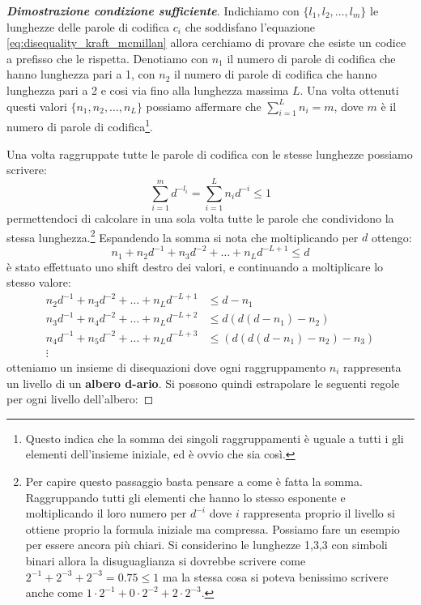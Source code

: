 \documentclass{article}
\theoremstyle{definition}
\numberwithin{equation}{section}
\begin{document}
\begin{proof}[\textbf{Dimostrazione condizione sufficiente}]
    Indichiamo con $\{l_1,l_2,\ldots,l_m\}$ le lunghezze delle parole di codifica $c_i$ che soddisfano l'equazione \eqref{eq:disequality_kraft_mcmillan} allora cerchiamo di provare che esiste un codice a prefisso che le rispetta. Denotiamo con $n_1$ il numero di parole di codifica che hanno lunghezza pari a 1, con $n_2$ il numero di parole di codifica che hanno lunghezza pari a 2 e cosi via fino alla lunghezza massima $L$. Una volta ottenuti questi valori $\{n_1,n_2,\ldots,n_L\}$ possiamo affermare che $\sum_{i=1}^L n_i=m$, dove $m$ è il numero di parole di codifica\footnote{Questo indica che la somma dei singoli raggruppamenti è uguale a tutti i gli elementi dell'insieme iniziale, ed è ovvio che sia così.}.

    Una volta raggruppate tutte le parole di codifica con le stesse lunghezze possiamo scrivere:
    \[
        \sum_{i=1}^m d^{-l_i}=\sum_{i=1}^L n_id^{-i}\leq 1
    \]
    permettendoci di calcolare in una sola volta tutte le parole che condividono la stessa lunghezza.\footnote{Per capire questo passaggio basta pensare a come è fatta la somma. Raggruppando tutti gli elementi che hanno lo stesso esponente e moltiplicando il loro numero per $d^{-i}$ dove $i$ rappresenta proprio il livello si ottiene proprio la formula iniziale ma compressa. Possiamo fare un esempio per essere ancora più chiari. Si considerino le lunghezze 1,3,3 con simboli binari allora la disuguaglianza si dovrebbe scrivere come $2^{-1}+ 2^{-3}+2^{-3}=0.75\leq1$ ma la stessa cosa si poteva benissimo scrivere anche come $1\cdot 2^{-1}+0\cdot 2^{-2}+2\cdot 2^{-3}$.} Espandendo la somma si nota che moltiplicando per $d$ ottengo:
    \[
        n_1+n_2d^{-1}+n_3d^{-2}+\ldots+n_Ld^{-L+1}\leq d
    \]
    è stato effettuato uno shift destro dei valori, e continuando a moltiplicare lo stesso valore:
    \begin{align*}
        n_2d^{-1}+n_3d^{-2}+\ldots+n_Ld^{-L+1} & \leq d-n_1                 \\
        n_3d^{-1}+n_4d^{-2}+\ldots+n_Ld^{-L+2} & \leq d(d(d-n_1)-n_2)       \\
        n_4d^{-1}+n_5d^{-2}+\ldots+n_Ld^{-L+3} & \leq (d(d(d-n_1)-n_2)-n_3) \\
        \vdots
    \end{align*}
    otteniamo un insieme di disequazioni dove ogni raggruppamento $n_i$ rappresenta un livello di un \textbf{albero d-ario}. Si possono quindi estrapolare le seguenti regole per ogni livello dell'albero:

\end{proof}
\end{document}
